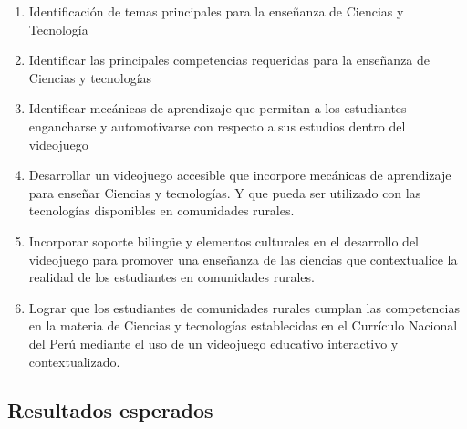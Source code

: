 \begin{enumerate}[label=O\arabic*.,itemsep=5pt]
    \item Identificación de temas principales para la enseñanza de Ciencias y Tecnología
    \item Identificar las principales competencias requeridas para la enseñanza de Ciencias y tecnologías
    \item Identificar mecánicas de aprendizaje que permitan a los estudiantes engancharse y automotivarse con respecto a sus estudios dentro del videojuego
    \item Desarrollar un videojuego accesible que incorpore mecánicas de aprendizaje para enseñar Ciencias y tecnologías. Y que pueda ser utilizado con las tecnologías disponibles en comunidades rurales.
    \item Incorporar soporte bilingüe y elementos culturales en el desarrollo del videojuego para promover una enseñanza de las ciencias que contextualice la realidad de los estudiantes en comunidades rurales.
    
    \item Lograr que los estudiantes de comunidades rurales cumplan las competencias en la materia de Ciencias y tecnologías establecidas en el Currículo Nacional del Perú mediante el uso de un videojuego educativo interactivo y contextualizado.
\end{enumerate}

\subsection{Resultados esperados}


